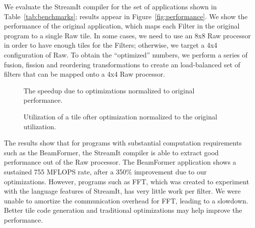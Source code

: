 We evaluate the StreamIt compiler for the set of applications shown in
Table~\ref{tab:benchmarks}; results appear in
Figure~\ref{fig:performance}.  We show the performance of the original
application, which maps each Filter in the original program to a
single Raw tile.  In some cases, we need to use an 8x8 Raw processor
in order to have enough tiles for the Filters; otherwise, we target a
4x4 configuration of Raw.  To obtain the ``optimized'' numbers, we
perform a series of fusion, fission and reordering transformations to
create an load-balanced set of filters that can be mapped onto a 4x4
Raw processor.

\begin{figure}
\begin{minipage}{3.2in}
\centering
{}
\caption{The speedup due to optimizations normalized to original performance.
\protect\label{fig:opt-diagram}}
\end{minipage}
\hspace{0.1in}
\begin{minipage}{3.2in}
\centering
{}
\caption{Utilization of a tile ofter optimization normalized to the original utilization.}
\end{minipage}
\end{figure}

The results show that for programs with substantial computation
requirements such as the BeamFormer, the StreamIt compiler is able to
extract good performance out of the Raw processor.  The BeamFormer
application shows a sustained 755 MFLOPS rate, after a 350\%
improvement due to our optimizations.  However, programs such as FFT,
which was created to experiment with the language features of
StreamIt, has very little work per filter. We were unable to amortize
the communication overhead for FFT, leading to a slowdown.  Better
tile code generation and traditional optimizations may help improve
the performance.

